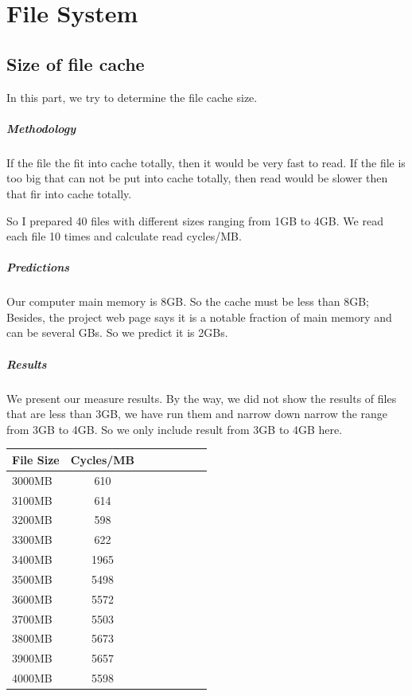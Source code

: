 \chapter{File System}

\section{Size of file cache}
In this part, we try to determine the file cache size.

\paragraph{Methodology}
If the file the fit into cache totally, then it would be very fast to read. If the file is too big that can not be put into cache totally, then read would be slower then that fir into cache totally. 

So I prepared 40 files with different sizes ranging from 1GB to 4GB. We read each file 10 times and calculate  read cycles/MB.

\paragraph{Predictions}
Our computer main memory is 8GB. So the cache must be less than 8GB; Besides, the project web page says it is a notable fraction of main memory and can be several GBs. So we predict it is 2GBs.

\paragraph{Results}
We present our measure results. By the way, we did not show the results of files that are less than 3GB, we have run them and narrow down 
narrow the range from 3GB to 4GB. So we only include result from 3GB to 4GB here.

\begin{center}
\begin{tabular}{l*{6}{c}r}
File Size             &  Cycles/MB\\
\hline
3000MB & 610 \\
3100MB & 614 \\
3200MB & 598 \\
3300MB & 622 \\
3400MB & 1965 \\
3500MB & 5498 \\
3600MB & 5572 \\
3700MB & 5503 \\
3800MB & 5673 \\
3900MB & 5657 \\
4000MB & 5598 \\

\end{tabular}
\end{center}

